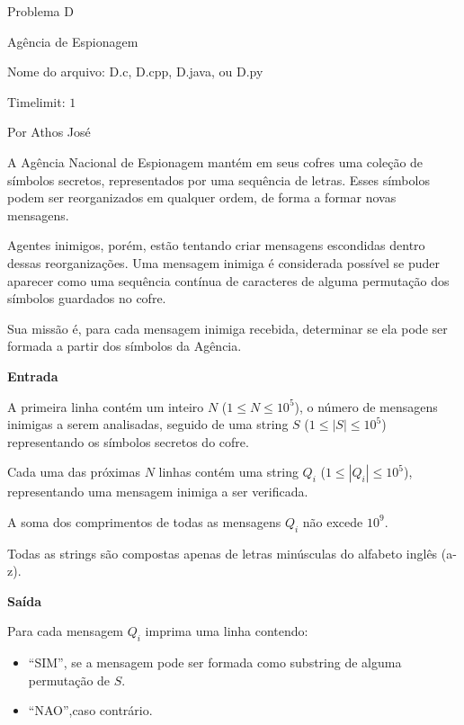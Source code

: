 \begin{center}
Problema D

Agência de Espionagem

{\small Nome do arquivo: D.c, D.cpp, D.java, ou D.py}

{\large Timelimit: $1$}

{\tiny Por Athos José}


\end{center}

A Agência Nacional de Espionagem mantém em seus cofres uma coleção de símbolos secretos, representados por uma sequência de letras. Esses símbolos podem ser reorganizados em qualquer ordem, de forma a formar novas mensagens.

Agentes inimigos, porém, estão tentando criar mensagens escondidas dentro dessas reorganizações. Uma mensagem inimiga é considerada possível se puder aparecer como uma sequência contínua de caracteres de alguma permutação dos símbolos guardados no cofre.

Sua missão é, para cada mensagem inimiga recebida, determinar se ela pode ser formada a partir dos símbolos da Agência.

\vspace{0.3cm}
\textbf{Entrada}

A primeira linha contém um inteiro $N$ ($1 \leq N \leq 10^5$), o número de mensagens inimigas a serem analisadas, seguido de uma string $S$ ($1 \leq |S| \leq 10^5$) representando os símbolos secretos do cofre.

Cada uma das próximas $N$ linhas contém uma string $Q_i$ ($1 \leq |Q_i| \leq 10^5$), representando uma mensagem inimiga a ser verificada.

A soma dos comprimentos de todas as mensagens $Q_i$ não excede $10^9$.

Todas as strings são compostas apenas de letras minúsculas do alfabeto inglês (a-z).

\vspace{0.3cm}
\textbf{Saída}

Para cada mensagem $Q_i$ imprima uma linha contendo:
\begin{itemize}
    \item ``SIM'', se a mensagem pode ser formada como substring de alguma permutação de $S$.
    \item ``NAO'',caso contrário.
\end{itemize}

